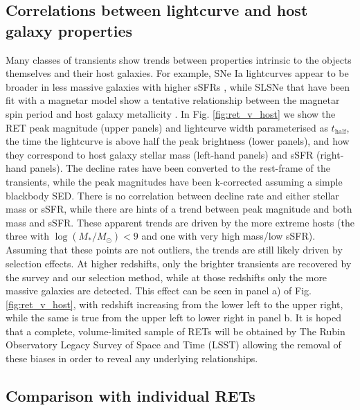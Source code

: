 \documentclass[fleqn,usenatbib,]{mnras}
\begin{document}
\subsection{Correlations between lightcurve and host galaxy properties \label{subsec:disc_correlations}}
Many classes of transients show trends between properties intrinsic to the objects themselves and their host galaxies. For example, SNe Ia lightcurves appear to be broader in less massive galaxies with higher sSFRs \citep{Sullivan2006,Neill2009,Howell2009,Sullivan2010,Roman2018,Kelsey2020}, while SLSNe that have been fit with a magnetar model show a tentative relationship between the magnetar spin period and host galaxy metallicity \citep{Chen2016a}. In Fig. \ref{fig:ret_v_host} we show the RET peak magnitude (upper panels) and lightcurve width parameterised as $t_{\mathrm{half}}$, the time the lightcurve is above half the peak brightness (lower panels), and how they correspond to host galaxy stellar mass (left-hand panels) and sSFR (right-hand panels). The decline rates have been converted to the rest-frame of the transients, while the peak magnitudes have been k-corrected assuming a simple blackbody SED. There is no correlation between decline rate and either stellar mass or sSFR, while there are hints of a trend between peak magnitude and both mass and sSFR. These apparent trends are driven by the more extreme hosts (the three with $\log\left(M_*/M_{\odot}\right) < 9$ and one with very high mass/low sSFR). Assuming that these points are not outliers, the trends are still likely driven by selection effects. At higher redshifts, only the brighter transients are recovered by the survey and our selection method, while at those redshifts only the more massive galaxies are detected. This effect can be seen in panel a) of Fig. \ref{fig:ret_v_host}, with redshift increasing from the lower left to the upper right, while the same is true from the upper left to lower right in panel b. It is hoped that a complete, volume-limited sample of RETs will be obtained by The Rubin Observatory Legacy Survey of Space and Time (LSST) allowing the removal of these biases in order to reveal any underlying relationships.

\subsection{Comparison with individual RETs \label{subsec:disc_lowz}}
\end{document}
